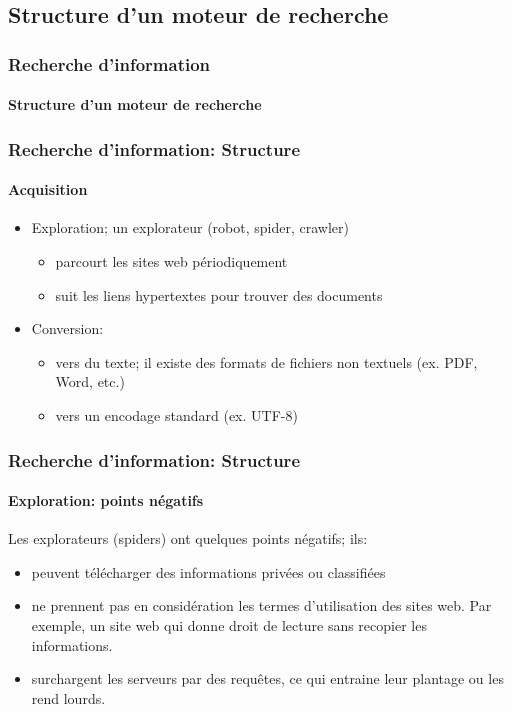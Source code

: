 \documentclass[xcolor=table]{beamer}
\begin{document}
\subsection{Structure d'un moteur de recherche}

\begin{frame}
\frametitle{Recherche d'information}
\framesubtitle{Structure d'un moteur de recherche}

\begin{center}
\end{center}

\end{frame}

\begin{frame}
\frametitle{Recherche d'information: Structure}
\framesubtitle{Acquisition}

\begin{itemize}
	\item Exploration; un explorateur (robot, spider, crawler)
	\begin{itemize}
		\item parcourt les sites web périodiquement 
		\item suit les liens hypertextes pour trouver des documents
	\end{itemize}

	\item Conversion:
	\begin{itemize}
		\item vers du texte; il existe des formats de fichiers non textuels (ex. PDF, Word, etc.)
		\item vers un encodage standard (ex. UTF-8)
	\end{itemize}
\end{itemize}

\end{frame}

\begin{frame}
\frametitle{Recherche d'information: Structure}
\framesubtitle{Exploration: points négatifs}

Les explorateurs (spiders) ont quelques points négatifs; ils:
\begin{itemize}
	\item peuvent télécharger des informations privées ou classifiées
	\item ne prennent pas en considération les termes d'utilisation des sites web. 
	Par exemple, un site web qui donne droit de lecture sans recopier les informations. 
	\item surchargent les serveurs par des requêtes, ce qui entraine leur plantage ou les rend lourds.
\end{itemize}

\end{frame}
\end{document}

